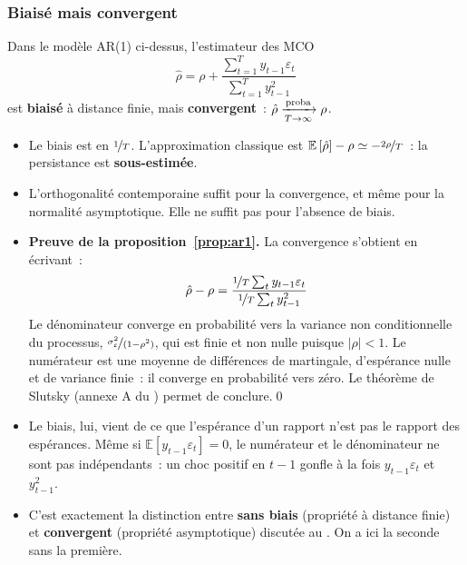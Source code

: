 \documentclass[10pt]{beamer}
\begin{document}
\begin{frame}
  \frametitle{Biaisé mais convergent}

  \begin{prop}\label{prop:ar1}
    Dans le modèle AR(1) ci-dessus, l'estimateur des MCO
    \[
      \hat\rho = \rho + \frac{\sum_{t=1}^T y_{t-1}\varepsilon_t}{\sum_{t=1}^T y_{t-1}^2}
    \]
    est \textbf{biaisé} à distance finie, mais \textbf{convergent}~:
    $\hat\rho\xrightarrow[T\rightarrow\infty]{\text{proba}}\rho$.
  \end{prop}

  \bigskip

  \begin{itemize}

  \item Le biais est en $\nicefrac{1}{T}$. L'approximation classique
    est $\mathbb E\left[ \hat\rho \right]-\rho \simeq -\nicefrac{2\rho}{T}$~: la
    persistance est \textbf{sous-estimée}.\newline

  \item L'orthogonalité contemporaine suffit pour la convergence, et même pour la
    normalité asymptotique. Elle ne suffit pas pour l'absence de biais.

  \end{itemize}

\end{frame}


\begin{notes}

  \begin{itemize}

  \item \textbf{Preuve de la proposition~\ref{prop:ar1}.} La convergence
    s'obtient en écrivant~:
    \[
      \hat\rho - \rho = \frac{\nicefrac{1}{T}\sum_t y_{t-1}\varepsilon_t}{\nicefrac{1}{T}\sum_t y_{t-1}^2}
    \]
    Le dénominateur converge en probabilité vers la variance non conditionnelle
    du processus, $\nicefrac{\sigma_{\varepsilon}^2}{(1-\rho^2)}$, qui est finie et non nulle
    puisque $|\rho|<1$. Le numérateur est une moyenne de différences de
    martingale, d'espérance nulle et de variance finie~: il converge en
    probabilité vers zéro. Le théorème de Slutsky (annexe A du )
    permet de conclure.\qed\newline

  \item Le biais, lui, vient de ce que l'espérance d'un rapport n'est pas le
    rapport des espérances. Même si $\mathbb E[y_{t-1}\varepsilon_t]=0$, le
    numérateur et le dénominateur ne sont pas indépendants~: un choc positif
    en $t-1$ gonfle à la fois $y_{t-1}\varepsilon_t$ et $y_{t-1}^2$.\newline

  \item C'est exactement la distinction entre \textbf{sans biais} (propriété à
    distance finie) et \textbf{convergent} (propriété asymptotique) discutée au
    . On a ici la seconde sans la première.

  \end{itemize}

\end{notes}
\end{document}
